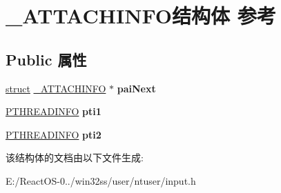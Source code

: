 \hypertarget{struct___a_t_t_a_c_h_i_n_f_o}{}\section{\+\_\+\+A\+T\+T\+A\+C\+H\+I\+N\+F\+O结构体 参考}
\label{struct___a_t_t_a_c_h_i_n_f_o}
\subsection*{Public 属性}
\begin{DoxyCompactItemize}
\item 
\mbox{\label{struct___a_t_t_a_c_h_i_n_f_o_ab4aa9dec7e539f00bd162765541f6f26}} 
\hyperlink{interfacestruct}{struct} \hyperlink{struct___a_t_t_a_c_h_i_n_f_o}{\+\_\+\+A\+T\+T\+A\+C\+H\+I\+N\+FO} $\ast$ {\bfseries pai\+Next}
\item 
\mbox{\label{struct___a_t_t_a_c_h_i_n_f_o_af72c68b960a029403ddf1665d491a22c}} 
\hyperlink{struct___t_h_r_e_a_d_i_n_f_o}{P\+T\+H\+R\+E\+A\+D\+I\+N\+FO} {\bfseries pti1}
\item 
\mbox{\label{struct___a_t_t_a_c_h_i_n_f_o_a18bc454055fa048b08ea500310ad938f}} 
\hyperlink{struct___t_h_r_e_a_d_i_n_f_o}{P\+T\+H\+R\+E\+A\+D\+I\+N\+FO} {\bfseries pti2}
\end{DoxyCompactItemize}


该结构体的文档由以下文件生成\+:\begin{DoxyCompactItemize}
\item 
E\+:/\+React\+O\+S-\/0../win32ss/user/ntuser/input.\+h\end{DoxyCompactItemize}
